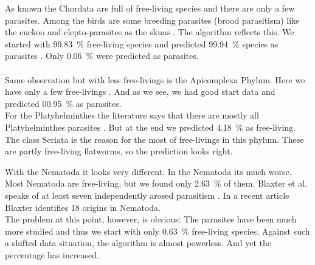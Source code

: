       As known the Chordata are full of free-living species and there are only a few parasites. Among 
        the birds are some breeding parasites (brood parasitism) like the cuckoo and clepto-parasites as 
        the skuas \cite{Rothschild1957}. The algorithm reflects this. We started with 99.83~\% 
        free-living species and predicted 99.94~\% species as parasites . 
        Only 0.06~\% were predicted as parasites. \\
       \\
      Same observation but with less free-livings is the Apicomplexa Phylum. Here we have only a few 
        free-livings . And as we see, we had good start data and predicted 00.95~\% as 
        parasites. \\
      For the Platyhelminthes the literature says that there are mostly all Platyhelminthes parasites
        . But at the end we predicted 4.18~\% as free-living. The class Seriata is the 
        reason for the most of free-livings in this phylum. These are partly free-living flatworms, so 
        the prediction looks right. \\
      
      With the Nematoda it looks very different. In the Nematoda its much worse. Most Nematoda are 
        free-living, but we found only 2.63~\% of them. Blaxter et al. speaks of at least seven 
        independently arosed parasitism \cite{Blaxter1998}. In a recent article Blaxter identifies 18 
        origins \cite{Blaxter2015} in Nematoda. \\
        The problem at this point, however, is obvious: The parasites have been much more studied and 
        thus we start with only 0.63~\% free-living species. Against such a shifted data situation, the 
        algorithm is almost powerless. And yet the percentage has increased.

